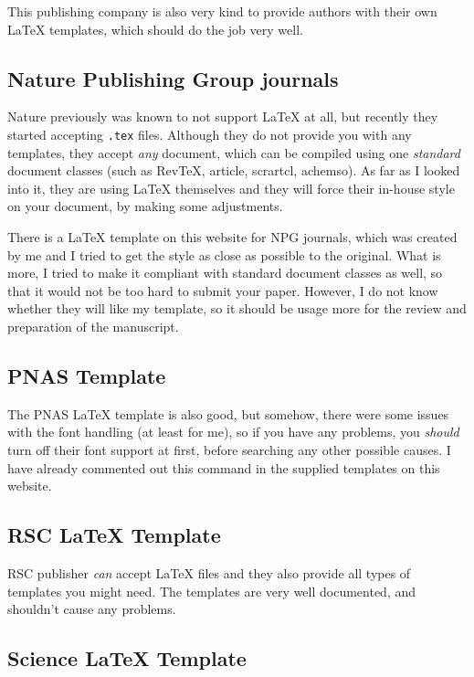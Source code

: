\documentclass[
]{scrartcl}
\begin{document}
This publishing company is also very kind to provide authors with their own
    \LaTeX{} templates, which should do the job very well.

%
\subsection{Nature Publishing Group journals}

Nature previously was known to not support \LaTeX{} at all, but recently they
    started accepting \verb|.tex| files.
%
Although they do not provide you with any templates, they accept \emph{any}
    document, which can be compiled using one \emph{standard} document classes
    (such as RevTeX, article, scrartcl, achemso).
%
As far as I looked into it, they are using \LaTeX{} themselves and they will
    force their in-house style on your document, by making some adjustments.

%
There is a \LaTeX{} template on this website for NPG journals, which was created
    by me and I tried to get the style as close as possible to the original.
%
What is more, I tried to make it compliant with standard document classes as
    well, so that it would not be too hard to submit your paper.
%
However, I do not know whether they will like my template, so it should be usage
    more for the review and preparation of the manuscript.

%
\subsection{PNAS Template}

%
The PNAS \LaTeX{} template is also good, but somehow, there were some issues
    with the font handling (at least for me), so if you have any problems, you
    \emph{should} turn off their font support at first, before searching any
    other possible causes.
%
I have already commented out this command in the supplied templates on this
    website.

%
\subsection{RSC \LaTeX{} Template}

%
RSC publisher \emph{can} accept \LaTeX{} files and they also provide all types
    of templates you might need.
%
The templates are very well documented, and shouldn't cause any problems.

%
\subsection{Science \LaTeX{} Template}
\end{document}
